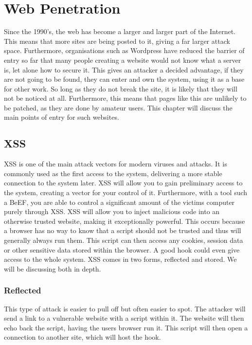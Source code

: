 \chapter{Web Penetration}
	\label{ch:WebPenetration}
	Since the 1990's, the web has become a larger and larger part of the Internet. 
	This means that more sites are being posted to it, giving a far larger attack space. 
	Furthermore, organisations such as Wordpress have reduced the barrier of entry so far that many people creating a website would not know what a server is, let alone how to secure it. 
	This gives an attacker a decided advantage, if they are not going to be found,
	they can enter and own the system, using it as a base for other work. 
	So long as they do not break the site, it is likely that they will not be noticed at all. 
	Furthermore, this means that pages like this are unlikely to be patched, as they are done by amateur users. 
	This chapter will discuss the main points of entry for such websites. 

	\section{XSS}
		XSS is one of the main attack vectors for modern viruses and attacks. 
		It is commonly used as the first access to the system, delivering a more stable connection to the system later. 
		XSS will allow you to gain preliminary access to the system, creating a vector for your control of it. 
		Furthermore, with a tool such a BeEF, you are able to control a significant amount of the victims computer purely through XSS. 
		XSS will allow you to inject malicious code into an otherwise trusted website, making it exceptionally powerful. 
		This occurs because a browser has no way to know that a script should not be trusted and thus will generally always run them. 
		This script can then access any cookies, session data or other sensitive data stored within the browser. 
		A good hook could even give access to the whole system. 
		XSS comes in two forms, reflected and stored. 
		We will be discussing both in depth. 
		\subsection{Reflected}
			This type of attack is easier to pull off but often easier to spot. 
			The attacker will send a link to a vulnerable website with a script within it. 
			The website will then echo back the script, having the users browser run it. 
			This script will then open a connection to another site, which will host the hook. 

